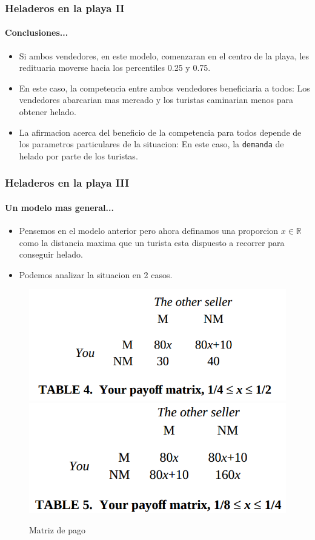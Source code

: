 \documentclass{beamer}
\begin{document}
\begin{frame}
  \frametitle{Heladeros en la playa II}
  \framesubtitle{Conclusiones...}
  \begin{itemize}
    \setlength{\itemsep}{4pt}
    \item Si ambos vendedores, en este modelo, comenzaran en el centro de la playa, les redituaria moverse hacia los percentiles 0.25 y 0.75.
    \pause
    \item En este caso, la competencia entre ambos vendedores beneficiaria a todos: Los vendedores abarcarian mas mercado y los turistas caminarian menos para obtener helado.
    \pause
    \item La afirmacion acerca del beneficio de la competencia para todos depende de los parametros particulares de la situacion: En este caso, la \texttt{demanda} de helado por parte de los turistas. 
  \end{itemize}
\end{frame}

\begin{frame}
  \frametitle{Heladeros en la playa III}
  \framesubtitle{Un modelo mas general...}
  \begin{itemize}
    \setlength{\itemsep}{4pt}
    \item Pensemos en el modelo anterior pero ahora definamos una proporcion $x \in \mathbb{R}$ como la distancia maxima que un turista esta dispuesto a recorrer para conseguir helado.
    \pause
    \item Podemos analizar la situacion en 2 casos.
    \pause
  \end{itemize}
    \begin{figure}[h!]
      \centering        
      \includegraphics[scale=0.25]{fig/nonzero-matrices-pago-playa-14-12.png}
      \includegraphics[scale=0.25]{fig/nonzero-matrices-pago-playa-18-14.png}
      \caption{Matriz de pago}
  \end{figure}
\end{frame}
\end{document}
